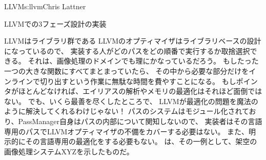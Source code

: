 \begin{aosachapter}{LLVM}{s:llvm}{Chris Lattner}
\begin{aosasect1}{LLVMでの3フェーズ設計の実装}
\begin{aosasect2}{LLVMはライブラリ群である}
LLVMのオプティマイザはライブラリベースの設計になっているので、
実装する人がどのパスをどの順番で実行するか取捨選択できる。
それは、画像処理のドメインでも理にかなっているだろう。
もしたった一つの大きな関数にすべてまとまっていたら、
その中から必要な部分だけをインラインで切り出すという作業に無駄な時間を費やすことになる。
もしポインタがほとんどなければ、エイリアスの解析やメモリの最適化はそれほど面倒ではない。
でも、いくら最善を尽くしたところで、
LLVMが最適化の問題を魔法のように解決してくれるわけじゃない！
パスのシステムはモジュール化されており、PassManager自身はパスの内部について関知しないので、
実装者はその言語専用のパスでLLVMオプティマイザの不備をカバーする必要はない。
また、明示的にその言語専用の最適化をする必要もない。
は、その一例として、架空の画像処理システムXYZを示したものだ。



\end{aosasect2}
\end{aosasect1}
\end{aosachapter}
